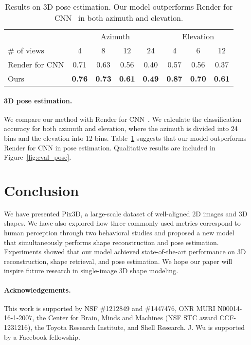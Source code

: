 \documentclass[10pt,twocolumn,letterpaper]{article}
\newcommand{\fig}[1]{Figure~\ref{#1}}
\newcommand{\tbl}[1]{Table~\ref{#1}}
\newcommand{\myparagraph}[1]{\vspace{-14pt}\paragraph{#1}}
\newcommand{\data}{Pix3D\xspace}
\begin{document}
\begin{table}[t]
 	\centering
    \setlength{\tabcolsep}{3pt}
    \begin{tabular}{lccccccc}
    \toprule
    & \multicolumn{4}{c}{Azimuth} & \multicolumn{3}{c}{Elevation} \\
    \cmidrule(lr){2-5}\cmidrule(lr){6-8}
    \# of views & 4 & 8 & 12 & 24 & 4 & 6 & 12 \\
    \midrule
    Render for CNN & 0.71 & 0.63 & 0.56 & 0.40 & 0.57 & 0.56 & 0.37 \\
    Ours & \textbf{0.76} & \textbf{0.73} & \textbf{0.61} & \textbf{0.49} & \textbf{0.87} & \textbf{0.70} & \textbf{0.61} \\
    \bottomrule
    \end{tabular}
    \vspace{-5pt}
    \caption{Results on 3D pose estimation. Our model outperforms Render for CNN~\cite{Su2015Render} in both azimuth and elevation.}
    \vspace{-15pt}
    \label{tbl:eval_pose}
\end{table}
 
\myparagraph{3D pose estimation.}

We compare our method with Render for CNN~\cite{Su2015Render}. We calculate the classification accuracy for both azimuth and elevation, where the azimuth is divided into 24 bins and the elevation into 12 bins. \tbl{tbl:eval_pose} suggests that our model outperforms Render for CNN in pose estimation. Qualitative results are included in \fig{fig:eval_pose}.

 \section{Conclusion}

We have presented \data, a large-scale dataset of well-aligned 2D images and 3D shapes. We have also explored how three commonly used metrics correspond to human perception through two behavioral studies and proposed a new model that simultaneously performs shape reconstruction and pose estimation. Experiments showed that our model achieved state-of-the-art performance on 3D reconstruction, shape retrieval, and pose estimation. We hope our paper will inspire future research in single-image 3D shape modeling.  \myparagraph{Acknowledgements.} This work is supported by NSF \#1212849 and \#1447476, ONR MURI N00014-16-1-2007, the Center for Brain, Minds and Machines (NSF STC award CCF-1231216), the Toyota Research Institute, and Shell Research. J. Wu is supported by a Facebook fellowship.  
{\small


}
\end{document}
